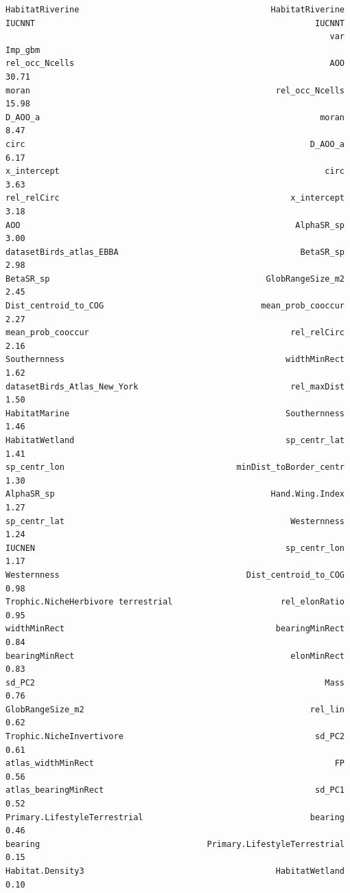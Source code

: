 \documentclass[
  letterpaper,
  DIV=11,
  numbers=noendperiod]{scrreprt}
\begin{document}
\begin{verbatim}
HabitatRiverine                                       HabitatRiverine
IUCNNT                                                         IUCNNT
                                                                  var Imp_gbm
rel_occ_Ncells                                                    AOO   30.71
moran                                                  rel_occ_Ncells   15.98
D_AOO_a                                                         moran    8.47
circ                                                          D_AOO_a    6.17
x_intercept                                                      circ    3.63
rel_relCirc                                               x_intercept    3.18
AOO                                                        AlphaSR_sp    3.00
datasetBirds_atlas_EBBA                                     BetaSR_sp    2.98
BetaSR_sp                                            GlobRangeSize_m2    2.45
Dist_centroid_to_COG                                mean_prob_cooccur    2.27
mean_prob_cooccur                                         rel_relCirc    2.16
Southernness                                             widthMinRect    1.62
datasetBirds_Atlas_New_York                               rel_maxDist    1.50
HabitatMarine                                            Southernness    1.46
HabitatWetland                                           sp_centr_lat    1.41
sp_centr_lon                                   minDist_toBorder_centr    1.30
AlphaSR_sp                                            Hand.Wing.Index    1.27
sp_centr_lat                                              Westernness    1.24
IUCNEN                                                   sp_centr_lon    1.17
Westernness                                      Dist_centroid_to_COG    0.98
Trophic.NicheHerbivore terrestrial                      rel_elonRatio    0.95
widthMinRect                                           bearingMinRect    0.84
bearingMinRect                                            elonMinRect    0.83
sd_PC2                                                           Mass    0.76
GlobRangeSize_m2                                              rel_lin    0.62
Trophic.NicheInvertivore                                       sd_PC2    0.61
atlas_widthMinRect                                                 FP    0.56
atlas_bearingMinRect                                           sd_PC1    0.52
Primary.LifestyleTerrestrial                                  bearing    0.46
bearing                                  Primary.LifestyleTerrestrial    0.15
Habitat.Density3                                       HabitatWetland    0.10

\end{verbatim}
\end{document}
